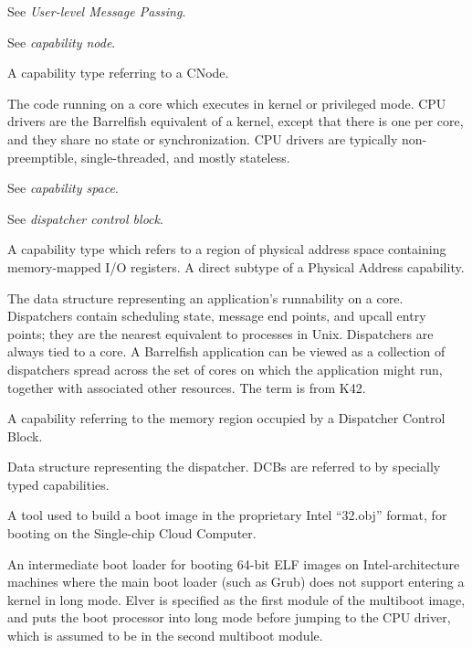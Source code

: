 \item[CC-UMP:] See \textit{User-level Message Passing}.

\item[cnode:] See \textit{capability node}.

\item[CNode capability:] A capability type referring to a CNode.

\item[CPU driver:] The code running on a core which executes in kernel or privileged mode.  CPU drivers are the Barrelfish equivalent of a kernel, except that there is one per core, and they share no state or synchronization. CPU drivers are typically non-preemptible, single-threaded, and mostly stateless.

\item[cspace:] See \textit{capability space}.

\item[DCB:] See \textit{dispatcher control block}.

\item[device frame capability:] A capability type which refers to a region of physical address space containing memory-mapped I/O registers. A direct subtype of a Physical Address capability.

\item[dispatcher:] The data structure representing an application's runnability on a core.  Dispatchers contain scheduling state, message end points, and upcall entry points; they are the nearest equivalent to processes in Unix. Dispatchers are always tied to a core.  A Barrelfish application can be viewed as a collection of dispatchers spread across the set of cores on which the application might run, together with associated other resources. The term is from K42.

\item[dispatcher capability:] A capability referring to the memory region occupied by a Dispatcher Control Block.

\item[dispatcher control block \textrm{\textit{(DCB)}}:] Data structure representing the dispatcher.  DCBs are referred to by specially typed capabilities.

\item[dite:] A tool used to build a boot image in the proprietary Intel ``32.obj'' format, for booting on the Single-chip Cloud Computer.

\item[Elver:] An intermediate boot loader for booting 64-bit ELF images on Intel-architecture machines where the main boot loader (such as Grub) does not support entering a kernel in long mode.  Elver is specified as the first module of the multiboot image, and puts the boot processor into long mode before jumping to the CPU driver, which is assumed to be in the second multiboot module.

